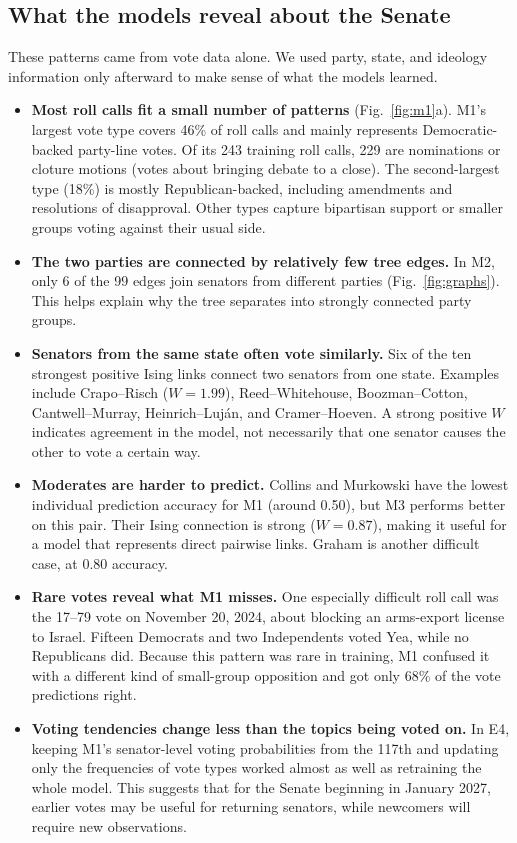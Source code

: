 \documentclass[10pt]{article}
\begin{document}
\subsection{What the models reveal about the Senate}
These patterns came from vote data alone. We used party, state, and ideology information only afterward to make sense of what the models learned.
\begin{itemize}
\item \textbf{Most roll calls fit a small number of patterns} (Fig.~\ref{fig:m1}a). M1's largest vote type covers 46\% of roll calls and mainly represents Democratic-backed party-line votes. Of its 243 training roll calls, 229 are nominations or cloture motions (votes about bringing debate to a close). The second-largest type (18\%) is mostly Republican-backed, including amendments and resolutions of disapproval. Other types capture bipartisan support or smaller groups voting against their usual side.
\item \textbf{The two parties are connected by relatively few tree edges.} In M2, only 6 of the 99 edges join senators from different parties (Fig.~\ref{fig:graphs}). This helps explain why the tree separates into strongly connected party groups.
\item \textbf{Senators from the same state often vote similarly.} Six of the ten strongest positive Ising links connect two senators from one state. Examples include Crapo--Risch ($W=1.99$), Reed--Whitehouse, Boozman--Cotton, Cantwell--Murray, Heinrich--Luj\'an, and Cramer--Hoeven. A strong positive $W$ indicates agreement in the model, not necessarily that one senator causes the other to vote a certain way.
\item \textbf{Moderates are harder to predict.} Collins and Murkowski have the lowest individual prediction accuracy for M1 (around 0.50), but M3 performs better on this pair. Their Ising connection is strong ($W=0.87$), making it useful for a model that represents direct pairwise links. Graham is another difficult case, at 0.80 accuracy.
\item \textbf{Rare votes reveal what M1 misses.} One especially difficult roll call was the 17--79 vote on November 20, 2024, about blocking an arms-export license to Israel. Fifteen Democrats and two Independents voted Yea, while no Republicans did. Because this pattern was rare in training, M1 confused it with a different kind of small-group opposition and got only 68\% of the vote predictions right.
\item \textbf{Voting tendencies change less than the topics being voted on.} In E4, keeping M1's senator-level voting probabilities from the 117th and updating only the frequencies of vote types worked almost as well as retraining the whole model. This suggests that for the Senate beginning in January 2027, earlier votes may be useful for returning senators, while newcomers will require new observations.
\end{itemize}
\end{document}

